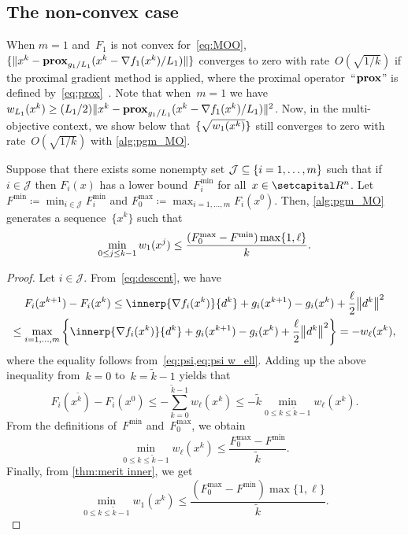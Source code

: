 \documentclass[../../main]{subfiles}
\begin{document}
\subsection{The non-convex case}
When $m = 1$ and~$F_1$ is not convex for~\cref{eq:MOO},~$\lbrace\lVert x^k - \operatorname{\mathbf{prox}}_{g_1/L_1} (x^k - \nabla f_1(x^k) / L_1) \rVert\rbrace$ converges to zero with rate~$O(\sqrt{1 / k})$ if the proximal gradient method is applied, where the proximal operator~``$\operatorname{\mathbf{prox}}$'' is defined by~\cref{eq:prox}~\cite{Beck2017}.
Note that when~$m = 1$ we have~$w_{L_1}(x^k) \ge (L_1 / 2) \lVert x^k - \operatorname{\mathbf{prox}}_{g_1/L_1} (x^k - \nabla f_1(x^k) / L_1) \rVert^2$.
Now, in the multi-objective context, we show below that~$\lbrace \sqrt{w_1(x^k)} \rbrace$ still converges to zero with rate~$O(\sqrt{1 / k})$ with \cref{alg:pgm_MO}.
\begin{theorem} \label{thm:rate nonconvex}
    Suppose that there exists some nonempty set $\mathcal{J} \subseteq \lbrace i = 1, \dots, m\rbrace$ such that if $i \in \mathcal{J}$ then $F_i(x)$ has a lower bound~$F_i^{\min}$ for all~$x \in \setR^n$.
    Let $F^{\min} \coloneqq \min_{i \in \mathcal{J}} F_i^{\min}$ and $F_0^{\max} \coloneqq \max_{i = 1, \dots, m} F_i(x^0)$.
	Then, \cref{alg:pgm_MO} generates a sequence~$\{x^k\}$ such that
    \[
		\min_{0 \le j \le k - 1} w_1(x^j) \le \frac{(F_0^{\max} - F^{\min}) \max \set*{ 1, \ell }}{k}
    .\]
\end{theorem}
\begin{proof}
    Let $i \in \mathcal{J}$. From~\cref{eq:descent}, we have
    \begin{multline}
        F_i(x^{k + 1}) - F_i(x^k) \le \innerp{\nabla f_i(x^k)}{d^k} + g_i(x^{k + 1}) - g_i(x^k) + \frac{\ell}{2} \norm*{ d^k}^2 \\
        \le \max_{i = 1, \dots, m} \left\{ \innerp{\nabla f_i(x^k)}{d^k} + g_i(x^{k + 1}) - g_i(x^k) + \frac{\ell}{2} \norm*{ d^k}^2 \right\}
        = - w_\ell(x^k)
    ,\end{multline}
    where the equality follows from~\cref{eq:psi,eq:psi w_ell}.
    Adding up the above inequality from~$k = 0$ to~$k = \tilde{k} - 1$ yields that
    \[
        F_i(x^{\tilde{k}}) - F_i(x^0) \le - \sum_{k = 0}^{\tilde{k} - 1} w_\ell(x^k)
		\le - \tilde{k} \min_{0 \le k \le \tilde{k} - 1} w_\ell(x^k).
    \]
    From the definitions of~$F^{\min}$ and~$F_0^{\max}$, we obtain
    \[
        \min_{0 \le k \le \tilde{k} - 1} w_\ell(x^k) \le \frac{F_0^{\max} - F^{\min}}{\tilde{k}}.
    \]
    Finally, from \cref{thm:merit inner}, we get
	\[
        \min_{0 \le k \le \tilde{k} - 1} w_1(x^k) \le \frac{(F_0^{\max} - F^{\min}) \max \{ 1, \ell \}}{\tilde{k}}.
	\]
\end{proof}
\end{document}
